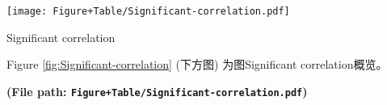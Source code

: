 \documentclass[
]{article}
\begin{document}
\begin{center}\vspace{1.5cm}\end{center}

\begin{center}\vspace{1.5cm}\end{center}
\def\@captype{figure}
\begin{center}
\texttt{[image: Figure+Table/Significant-correlation.pdf]}
\caption{Significant correlation}\label{fig:Significant-correlation}
\end{center}

Figure \ref{fig:Significant-correlation} (下方图) 为图Significant correlation概览。

\textbf{(File path: \texttt{Figure+Table/Significant-correlation.pdf})}

\begin{center}\vspace{1.5cm}\end{center}

\begin{center}\vspace{1.5cm}\end{center}
\end{document}
